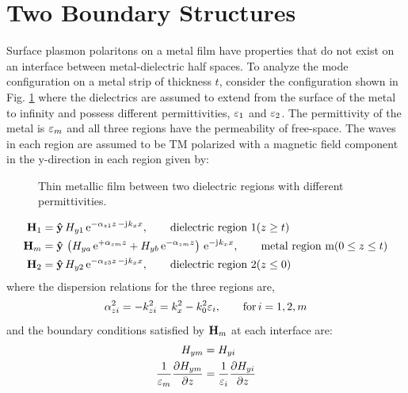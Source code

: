 \documentclass[11pt]{article}
\begin{document}
\section{Two Boundary Structures}
%
Surface plasmon polaritons on a metal film have properties that do not exist on an interface between metal-dielectric half spaces. To analyze the mode configuration on a metal strip of thickness $t$, consider the configuration shown in Fig. \ref{fig:3layer} where the dielectrics are assumed to extend from the surface of the metal to infinity and possess different permittivities, $\varepsilon_1$ and $\varepsilon_2$. The permittivity of the metal is $\varepsilon_m$ and all three regions have the permeability of free-space. The waves in each region are assumed to be TM polarized with a magnetic field component in the y-direction in each region given by:
%
\begin{figure}[b!]
  \centering
  \def\svgwidth{.5\linewidth}
  
  \caption{Thin metallic film between two dielectric regions with different permittivities.}
  \label{fig:3layer}
\end{figure}
%
\begin{subequations}
  \begin{align}
    \mathbf{H}_1 ={}& \mathbf{\hat{y}} \,H_{y1} \, \mathrm{e}^{ -\alpha_{z1}z \,- \mathrm{j}\mkern1mu k_x x}, \qquad	 		\text{dielectric region 1} (z \ge t)
    \label{eq:H1_3layer}\\
    \mathbf{H}_m ={}& \mathbf{\hat{y}} \,\left( H_{ya}\, \mathrm{e}^{ +\alpha_{zm}z} + H_{yb}\, \mathrm{e}^{ -\alpha_{zm}z} \right) \, \mathrm{e}^{ - \mathrm{j}\mkern1mu k_x x}, \qquad	 		\text{metal region m} (0 \le z \le t)
    \label{eq:Hm_3layer}\\
    \mathbf{H}_2 ={}& \mathbf{\hat{y}} \,H_{y2} \, \mathrm{e}^{ -\alpha_{z3}z \, - \mathrm{j}\mkern1mu k_x x}, \qquad	 		\text{dielectric region 2} (z \le 0)
    \label{eq:H2_3layer}
  \end{align}
  \label{eq:H_3layer}%
\end{subequations}
%
where the dispersion relations for the three regions are,
%
\begin{equation}
  \alpha_{zi}^2 = -k_{zi}^2 = k_x^2 - k_0^2 \varepsilon_i, \qquad	  \text{for} \,
  i=1,2,m
  \label{eq:3_layer_disp}
\end{equation}
%
and the boundary conditions satisfied by $\mathbf{H}_m$ at each interface are:
%
\begin{subequations}
  \begin{align}
    {H_{ym}} ={}& {H_{yi}}
    \label{eq:bc1_3layer}\\
    \frac{1}{\varepsilon_m}\pdv{H_{ym}}{z}  ={}& \frac{1}{\varepsilon_i}\pdv{H_{yi}}{z}
    \label{eq:bc2_3layer}
  \end{align}
  \label{eq:bc_3layer}%
\end{subequations}
\end{document}
